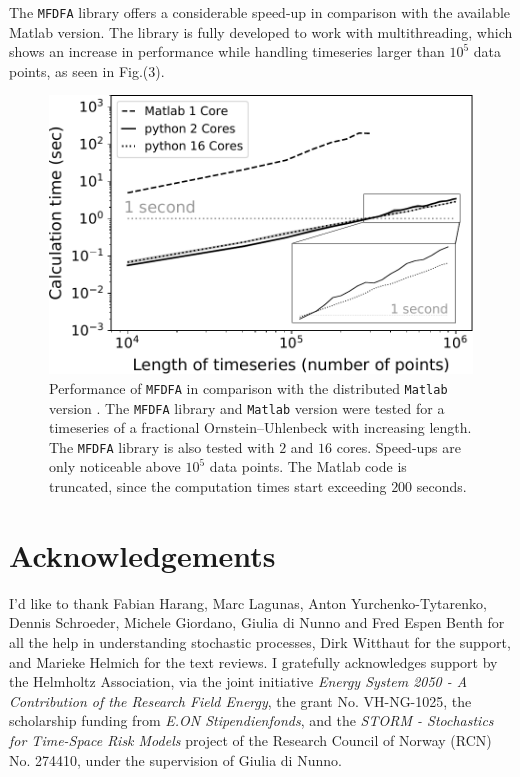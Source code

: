 \documentclass[pre, a4paper, aps, floatfix, superscriptaddress, onecolumn, notitlepage, longbibliography]{revtex4-1} %
\begin{document}
The \texttt{MFDFA} library offers a considerable speed-up in comparison with the available Matlab version.
The library is fully developed to work with multithreading, which shows an increase in performance while handling timeseries larger than $10^5$ data points, as seen in Fig.(3).

\begin{figure}[h]
  \includegraphics[width = 0.5\linewidth]{fig3.pdf}
  \caption{Performance of \texttt{MFDFA} in comparison with the distributed \texttt{Matlab} version \cite{Ihlen2012}.
  The \texttt{MFDFA} library and \texttt{Matlab} version were tested for a timeseries of a fractional Ornstein--Uhlenbeck with increasing length.
  The \texttt{MFDFA} library is also tested with $2$ and $16$ cores.
  Speed-ups are only noticeable above $10^5$ data points.
  The Matlab code is truncated, since the computation times start exceeding $200$ seconds.}
\end{figure}


\section*{Acknowledgements}
I'd like to thank Fabian Harang, Marc Lagunas, Anton Yurchenko-Tytarenko, Dennis Schroeder, Michele Giordano, Giulia di Nunno and Fred Espen Benth for all the help in understanding stochastic processes, Dirk Witthaut for the support, and Marieke Helmich for the text reviews.
I gratefully acknowledges support by the Helmholtz Association, via the joint initiative \textit{Energy System 2050 - A Contribution of the Research Field Energy}, the grant No. VH-NG-1025, the scholarship funding from \textit{E.ON Stipendienfonds}, and the \textit{STORM - Stochastics for Time-Space Risk Models} project of the Research Council of Norway (RCN) No. 274410, under the supervision of Giulia di Nunno.


\end{document}
